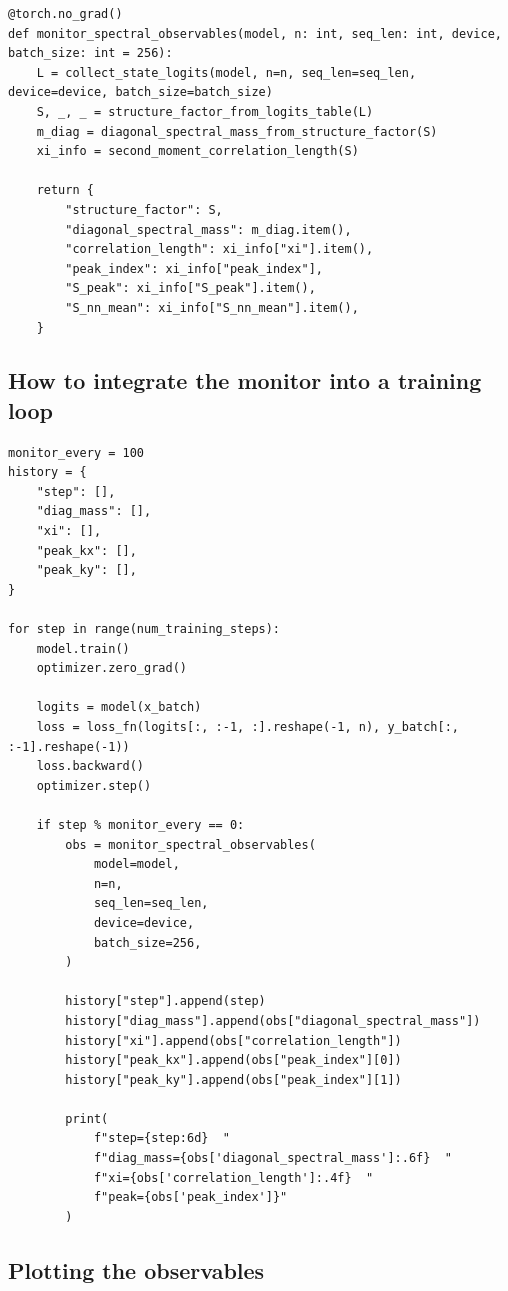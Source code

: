 \documentclass[11pt]{article}
\begin{document}
\begin{lstlisting}[style=pythonstyle]
@torch.no_grad()
def monitor_spectral_observables(model, n: int, seq_len: int, device, batch_size: int = 256):
    L = collect_state_logits(model, n=n, seq_len=seq_len, device=device, batch_size=batch_size)
    S, _, _ = structure_factor_from_logits_table(L)
    m_diag = diagonal_spectral_mass_from_structure_factor(S)
    xi_info = second_moment_correlation_length(S)

    return {
        "structure_factor": S,
        "diagonal_spectral_mass": m_diag.item(),
        "correlation_length": xi_info["xi"].item(),
        "peak_index": xi_info["peak_index"],
        "S_peak": xi_info["S_peak"].item(),
        "S_nn_mean": xi_info["S_nn_mean"].item(),
    }
\end{lstlisting}

\subsection{How to integrate the monitor into a training loop}

\begin{lstlisting}[style=pythonstyle]
monitor_every = 100
history = {
    "step": [],
    "diag_mass": [],
    "xi": [],
    "peak_kx": [],
    "peak_ky": [],
}

for step in range(num_training_steps):
    model.train()
    optimizer.zero_grad()

    logits = model(x_batch)
    loss = loss_fn(logits[:, :-1, :].reshape(-1, n), y_batch[:, :-1].reshape(-1))
    loss.backward()
    optimizer.step()

    if step % monitor_every == 0:
        obs = monitor_spectral_observables(
            model=model,
            n=n,
            seq_len=seq_len,
            device=device,
            batch_size=256,
        )

        history["step"].append(step)
        history["diag_mass"].append(obs["diagonal_spectral_mass"])
        history["xi"].append(obs["correlation_length"])
        history["peak_kx"].append(obs["peak_index"][0])
        history["peak_ky"].append(obs["peak_index"][1])

        print(
            f"step={step:6d}  "
            f"diag_mass={obs['diagonal_spectral_mass']:.6f}  "
            f"xi={obs['correlation_length']:.4f}  "
            f"peak={obs['peak_index']}"
        )
\end{lstlisting}

\subsection{Plotting the observables}
\end{document}
